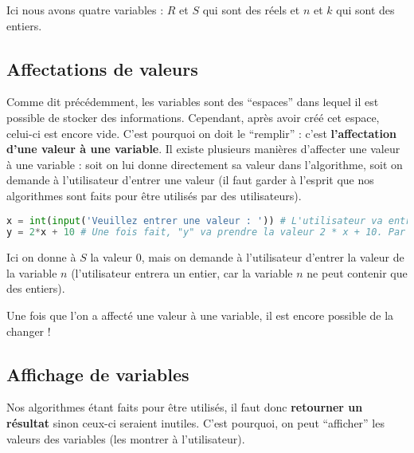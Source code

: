 	\begin{tip}
		Ici nous avons quatre variables : $R$ et $S$ qui sont des réels et $n$ et $k$ qui sont des entiers.
	\end{tip}

	\subsection{Affectations de valeurs}

	Comme dit précédemment, les variables sont des ``espaces'' dans lequel il est possible de stocker des informations.
	\newpar
	Cependant, après avoir créé cet espace, celui-ci est encore vide. C'est pourquoi on doit le ``remplir'' : c'est \textbf{l'affectation d'une valeur à une variable}.
	\newpar
	Il existe plusieurs manières d'affecter une valeur à une variable : soit on lui donne directement sa valeur dans l'algorithme, soit on demande à l'utilisateur d'entrer une valeur (il faut garder à l'esprit que nos algorithmes sont faits pour être utilisés par des utilisateurs).

	\begin{formula}[En python]
		\entretitreetliste
\begin{lstlisting}[language=python]
x = int(input('Veuillez entrer une valeur : ')) # L'utilisateur va entrer une valeur, on la convertir en entier et on va affecter celui-ci à notre variable "x".
y = 2*x + 10 # Une fois fait, "y" va prendre la valeur 2 * x + 10. Par exemple, si l'utilisateur entre "10", "y" vaudra 30.
\end{lstlisting}
	\end{formula}

	\begin{tip}
		Ici on donne à $S$ la valeur $0$, mais on demande à l'utilisateur d'entrer la valeur de la variable $n$ (l'utilisateur entrera un entier, car la variable $n$ ne peut contenir que des entiers).
	\end{tip}

	Une fois que l'on a affecté une valeur à une variable, il est encore possible de la changer !

	\subsection{Affichage de variables}

	Nos algorithmes étant faits pour être utilisés, il faut donc \textbf{retourner un résultat} sinon ceux-ci seraient inutiles.
	\newline
	C'est pourquoi, on peut ``afficher'' les valeurs des variables (les montrer à l'utilisateur).

